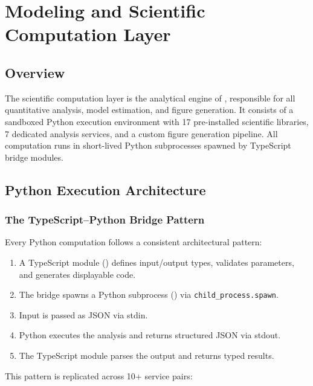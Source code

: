 \chapter{Modeling and Scientific Computation Layer}
\label{ch:modeling}

\section{Overview}
\label{sec:modeling:overview}

The scientific computation layer is the analytical engine of \autoscholar, responsible for all quantitative analysis, model estimation, and figure generation.
It consists of a sandboxed Python execution environment with 17 pre-installed scientific libraries, 7 dedicated analysis services, and a custom figure generation pipeline.
All computation runs in short-lived Python subprocesses spawned by TypeScript bridge modules.

\section{Python Execution Architecture}
\label{sec:modeling:python}

\subsection{The TypeScript--Python Bridge Pattern}

Every Python computation follows a consistent architectural pattern:

\begin{enumerate}
  \item A TypeScript module () defines input/output types, validates parameters, and generates displayable code.
  \item The bridge spawns a Python subprocess () via \texttt{child\_process.spawn}.
  \item Input is passed as JSON via stdin.
  \item Python executes the analysis and returns structured JSON via stdout.
  \item The TypeScript module parses the output and returns typed results.
\end{enumerate}

This pattern is replicated across 10+ service pairs:

